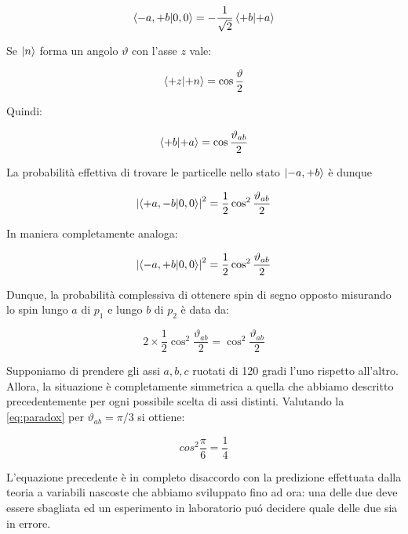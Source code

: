 	\begin{equation}
		\braket{-a, +b}{0, 0} = - \frac{1}{\sqrt{2}} \braket{+b}{+a}
	\end{equation}

Se $\ket{n}$ forma un angolo $\vartheta$ con l'asse $z$ vale:

	\begin{equation}
		\braket{+z}{+n} = \cos \frac{\vartheta}{2}
	\end{equation}

Quindi:

	\begin{equation}
		\braket{+b}{+a} = \cos \frac{\vartheta_{ab}}{2}
	\end{equation}

La probabilit\`a effettiva di trovare le particelle nello stato $\ket{-a, +b}$ \`e dunque

	\begin{equation}
		\left | \braket{+a, -b}{0, 0} \right | ^ 2  = \frac{1}{2} \cos^2 \frac{\vartheta_{ab}}{2}
	\end{equation}

In maniera completamente analoga:

	\begin{equation}
		\left | \braket{-a, +b}{0, 0} \right | ^ 2  = \frac{1}{2} \cos^2 \frac{\vartheta_{ab}}{2}
	\end{equation}

Dunque, la probabilit\`a complessiva di ottenere spin di segno opposto misurando lo spin lungo $a$ di $p_1$ e lungo $b$ di $p_2$ \`e data da:

	\begin{equation} \label{eq:paradox}
		2 \times \frac{1}{2} \cos ^2 \frac{\vartheta_{ab}}{2} = \cos^2 \frac{\vartheta_{ab}}{2}
	\end{equation}

Supponiamo di prendere gli assi $a, b, c$ ruotati di 120 gradi l'uno rispetto all'altro. Allora, la situazione \`e completamente simmetrica a quella che abbiamo descritto precedentemente per ogni possibile scelta di assi distinti. Valutando la \eqref{eq:paradox} per $\vartheta_{ab} = \pi / 3$ si ottiene:

	\begin{equation}
		cos^2 \frac{\pi}{6} = \frac{1}{4}
	\end{equation}

L'equazione precedente \`e in completo disaccordo con la predizione effettuata dalla teoria a variabili nascoste che abbiamo sviluppato fino ad ora: una delle due deve essere sbagliata ed un esperimento in laboratorio pu\'o decidere quale delle due sia in errore.
